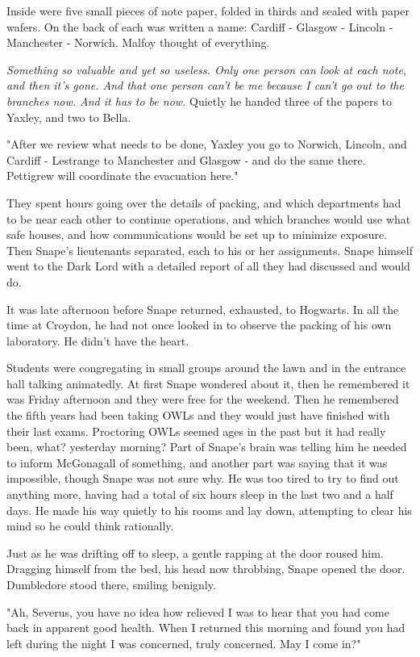Inside were five small pieces of note paper, folded in thirds and sealed with paper wafers. On the back of each was written a name: Cardiff - Glasgow - Lincoln - Manchester - Norwich. Malfoy thought of everything.

\emph{Something so valuable and yet so useless. Only one person can look at each note, and then it's gone. And that one person can't be me because I can't go out to the branches now. And it has to be now.} Quietly he handed three of the papers to Yaxley, and two to Bella.

"After we review what needs to be done, Yaxley you go to Norwich, Lincoln, and Cardiff - Lestrange to Manchester and Glasgow - and do the same there. Pettigrew will coordinate the evacuation here."

They spent hours going over the details of packing, and which departments had to be near each other to continue operations, and which branches would use what safe houses, and how communications would be set up to minimize exposure. Then Snape's lieutenants separated, each to his or her assignments. Snape himself went to the Dark Lord with a detailed report of all they had discussed and would do.

It was late afternoon before Snape returned, exhausted, to Hogwarts. In all the time at Croydon, he had not once looked in to observe the packing of his own laboratory. He didn't have the heart.

Students were congregating in small groups around the lawn and in the entrance hall talking animatedly. At first Snape wondered about it, then he remembered it was Friday afternoon and they were free for the weekend. Then he remembered the fifth years had been taking OWLs and they would just have finished with their last exams. Proctoring OWLs seemed ages in the past but it had really been, what? yesterday morning? Part of Snape's brain was telling him he needed to inform McGonagall of something, and another part was saying that it was impossible, though Snape was not sure why. He was too tired to try to find out anything more, having had a total of six hours sleep in the last two and a half days. He made his way quietly to his rooms and lay down, attempting to clear his mind so he could think rationally.

Just as he was drifting off to sleep, a gentle rapping at the door roused him. Dragging himself from the bed, his head now throbbing, Snape opened the door. Dumbledore stood there, smiling benignly.

"Ah, Severus, you have no idea how relieved I was to hear that you had come back in apparent good health. When I returned this morning and found you had left during the night I was concerned, truly concerned. May I come in?"

